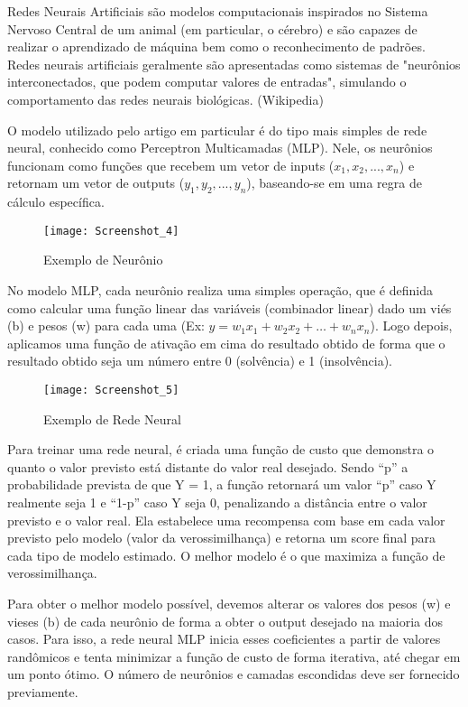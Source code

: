 \documentclass[12pt, a4paper]{article}
\begin{document}
Redes Neurais Artificiais são modelos computacionais inspirados no Sistema Nervoso Central de um animal (em particular, o cérebro) e são capazes de realizar o aprendizado de máquina bem como o reconhecimento de padrões. Redes neurais artificiais geralmente são apresentadas como sistemas de "neurônios interconectados, que podem computar valores de entradas", simulando o comportamento das redes neurais biológicas. (Wikipedia)

O modelo utilizado pelo artigo em particular é do tipo mais simples de rede neural, conhecido como Perceptron Multicamadas (MLP). Nele, os neurônios funcionam como funções que recebem um vetor de inputs ($x_{1}, x_{2}, ..., x_{n}$) e retornam um vetor de outputs ($y_{1}, y_{2}, ...,y_{n}$), baseando-se em uma regra de cálculo específica.

\begin{figure}[h]
    \centering
    \texttt{[image: Screenshot\_4]} %
    \caption{Exemplo de Neurônio}
\end{figure}

No modelo MLP, cada neurônio realiza uma simples operação, que é definida como calcular uma função linear das variáveis (combinador linear) dado um viés (b) e pesos (w) para cada uma (Ex: $y = w_{1}x_{1} + w_{2}x_{2} + … + w_{n}x_{n}$). Logo depois, aplicamos uma função de ativação em cima do resultado obtido de forma que o resultado obtido seja um número entre 0 (solvência) e 1 (insolvência).

\begin{figure}[h]
    \centering
    \texttt{[image: Screenshot\_5]} %
    \caption{Exemplo de Rede Neural}
    \label{script} %
\end{figure}

Para treinar uma rede neural, é criada uma função de custo que demonstra o quanto o valor previsto está distante do valor real desejado. Sendo “p” a probabilidade prevista de que Y = 1, a função retornará um valor “p” caso Y realmente seja 1 e “1-p” caso Y seja 0, penalizando a distância entre o valor previsto e o valor real. Ela estabelece uma recompensa com base em cada valor previsto pelo modelo (valor da verossimilhança) e retorna um score final para cada tipo de modelo estimado. O melhor modelo é o que maximiza a função de verossimilhança.

Para obter o melhor modelo possível, devemos alterar os valores dos pesos (w) e vieses (b) de cada neurônio de forma a obter o output desejado na maioria dos casos. Para isso, a rede neural MLP inicia esses coeficientes a partir de valores randômicos e tenta minimizar a função de custo de forma iterativa, até chegar em um ponto ótimo. O número de neurônios e camadas escondidas deve ser fornecido previamente.
\end{document}
